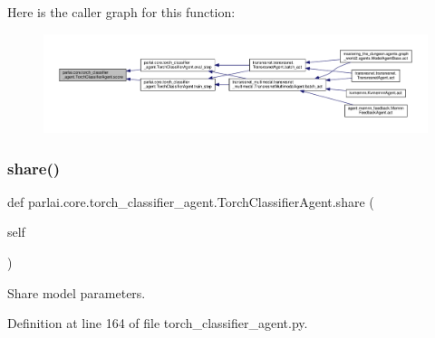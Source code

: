 Here is the caller graph for this function\+:
\nopagebreak
\begin{figure}[H]
\begin{center}
\leavevmode
\includegraphics[width=350pt]{classparlai_1_1core_1_1torch__classifier__agent_1_1TorchClassifierAgent_a04e97e79ef7e497c0927c10b31e42337_icgraph}
\end{center}
\end{figure}
\mbox{\label{classparlai_1_1core_1_1torch__classifier__agent_1_1TorchClassifierAgent_a33e56566ee5e81b257b049bd6a3c1cd6}} 
\subsubsection{\texorpdfstring{share()}{share()}}
{\footnotesize\ttfamily def parlai.\+core.\+torch\+\_\+classifier\+\_\+agent.\+Torch\+Classifier\+Agent.\+share (\begin{DoxyParamCaption}\item[{}]{self }\end{DoxyParamCaption})}

\begin{DoxyVerb}Share model parameters.\end{DoxyVerb}
 

Definition at line 164 of file torch\+\_\+classifier\+\_\+agent.\+py.



